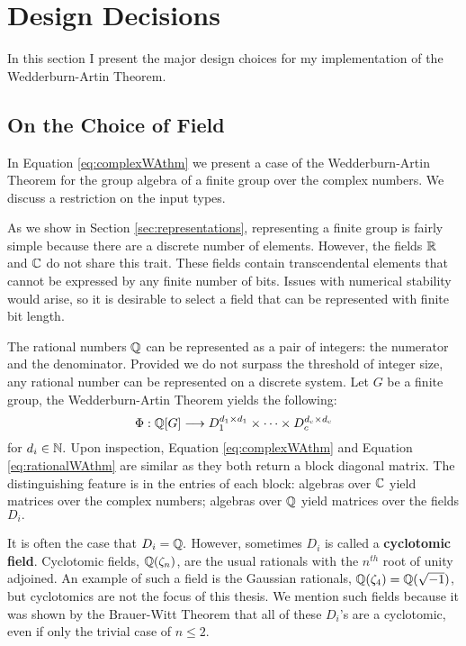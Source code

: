 \documentclass[../thesis.tex]{subfiles}
\begin{document}
\section{Design Decisions}\label{sec:outline}
In this section I present the major design choices for my implementation of the Wedderburn-Artin Theorem.

\subsection{On the Choice of Field}
In Equation \ref{eq:complexWAthm} we present a case of the Wedderburn-Artin Theorem for the group algebra of a finite group over the complex numbers. We discuss a restriction on the input types.

As we show in Section \ref{sec:representations}, representing a finite group is fairly simple because there are a discrete number of elements. However, the fields $\mathbb{R}$ and $\mathbb{C}$ do not share this trait. These fields contain transcendental elements that cannot be expressed by any finite number of bits. Issues with numerical stability would arise, so it is desirable to select a field that can be represented with finite bit length.

The rational numbers $\mathbb{Q}$ can be represented as a pair of integers: the numerator and the denominator. Provided we do not surpass the threshold of integer size, any rational number can be represented on a discrete system. Let $G$ be a finite group, the Wedderburn-Artin Theorem \cite{hypercomplexArt}\cite{hypercomplexWedd} yields the following:
\begin{equation}\label{eq:rationalWAthm}
    \Phi: \mathbb{Q}[G] \longrightarrow D_1^{d_1\times d_1}\times\cdots\times D_c^{d_c\times d_c}
\end{equation}
for $d_i\in\mathbb{N}.$ Upon inspection, Equation \ref{eq:complexWAthm} and Equation \ref{eq:rationalWAthm} are similar as they both return a block diagonal matrix. The distinguishing feature is in the entries of each block: algebras over $\mathbb{C}$ yield matrices over the complex numbers; algebras over $\mathbb{Q}$ yield matrices over the fields $D_i.$

It is often the case that $D_i = \mathbb{Q}.$ However, sometimes $D_i$ is called a \textbf{cyclotomic field}. Cyclotomic fields, $\mathbb{Q}(\zeta_n)$, are the usual rationals with the $n^{th}$ root of unity adjoined. An example of such a field is the Gaussian rationals, $\mathbb{Q}(\zeta_4) = \mathbb{Q}(\sqrt{-1})$, but cyclotomics are not the focus of this thesis. We mention such fields because it was shown by the Brauer-Witt Theorem \cite{brauerwitt} that all of these $D_i$'s are a cyclotomic, even if only the trivial case of $n\leq 2.$
\end{document}
